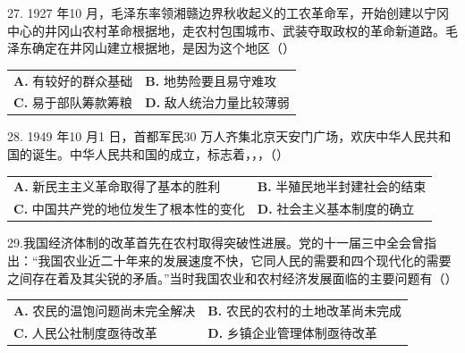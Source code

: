 \documentclass[UTF8,11pt]{ctexart}
\begin{document}
27. 1927 年10 月，毛泽东率领湘赣边界秋收起义的工农革命军，开始创建以宁冈中心的井冈山农村革命根据地，走农村包围城市、武装夺取政权的革命新道路。毛泽东确定在井冈山建立根据地，是因为这个地区（）


\begin{center}\begin{tabular}{>{\raggedright\arraybackslash}p{\dimexpr(\linewidth-4\tabcolsep)/2\relax}>{\raggedright\arraybackslash}p{\dimexpr(\linewidth-4\tabcolsep)/2\relax}}
\textbf{A.} 有较好的群众基础 & \textbf{B.} 地势险要且易守难攻\\[.35em]
\textbf{C.} 易于部队筹款筹粮 & \textbf{D.} 敌人统治力量比较薄弱\\[.35em]\end{tabular}\end{center}

28. 1949 年10 月1 日，首都军民30 万人齐集北京天安门广场，欢庆中华人民共和国的诞生。中华人民共和国的成立，标志着，，，（）


\begin{center}\begin{tabular}{>{\raggedright\arraybackslash}p{\dimexpr(\linewidth-4\tabcolsep)/2\relax}>{\raggedright\arraybackslash}p{\dimexpr(\linewidth-4\tabcolsep)/2\relax}}
\textbf{A.} 新民主主义革命取得了基本的胜利 & \textbf{B.} 半殖民地半封建社会的结束\\[.35em]
\textbf{C.} 中国共产党的地位发生了根本性的变化 & \textbf{D.} 社会主义基本制度的确立\\[.35em]\end{tabular}\end{center}

29.我国经济体制的改革首先在农村取得突破性进展。党的十一届三中全会曾指出：“我国农业近二十年来的发展速度不快，它同人民的需要和四个现代化的需要之间存在着及其尖锐的矛盾。”当时我国农业和农村经济发展面临的主要问题有（）


\begin{center}\begin{tabular}{>{\raggedright\arraybackslash}p{\dimexpr(\linewidth-4\tabcolsep)/2\relax}>{\raggedright\arraybackslash}p{\dimexpr(\linewidth-4\tabcolsep)/2\relax}}
\textbf{A.} 农民的温饱问题尚未完全解决 & \textbf{B.} 农民的农村的土地改革尚未完成\\[.35em]
\textbf{C.} 人民公社制度亟待改革 & \textbf{D.} 乡镇企业管理体制亟待改革\\[.35em]\end{tabular}\end{center}
\end{document}
